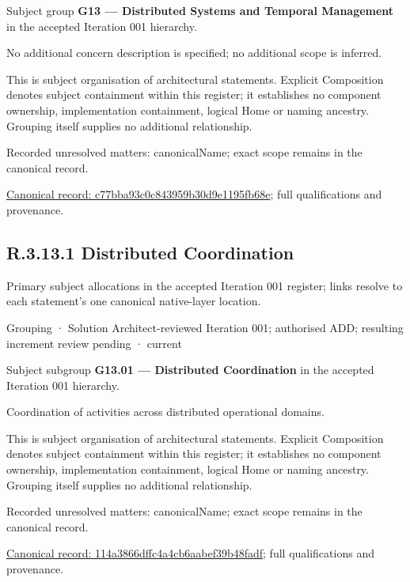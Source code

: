 Subject group \textbf{G13 — Distributed Systems and Temporal Management} in the accepted Iteration 001 hierarchy.



No additional concern description is specified; no additional scope is inferred.



This is subject organisation of architectural statements. Explicit Composition denotes subject containment within this register; it establishes no component ownership, implementation containment, logical Home or naming ancestry. Grouping itself supplies no additional relationship.


{\small Recorded unresolved matters: canonicalName; exact scope remains in the canonical record.}\par
{\footnotesize \href{../../../../continuum/grouping/c77bba93c0c843959b30d9e1195fb68e.md}{Canonical record: c77bba93c0c843959b30d9e1195fb68e}; full qualifications and provenance.}\par
\subsection*{R.3.13.1 Distributed Coordination}
\label{navigation:R.3.13.1}

Primary subject allocations in the accepted Iteration 001 register; links resolve to each statement’s one canonical native-layer location.\par
\label{element:114a3866dffc4a4cb6aabef39b48fadf}
{\small Grouping · Solution Architect-reviewed Iteration 001; authorised ADD; resulting increment review pending · current}\par

Subject subgroup \textbf{G13.01 — Distributed Coordination} in the accepted Iteration 001 hierarchy.



Coordination of activities across distributed operational domains.



This is subject organisation of architectural statements. Explicit Composition denotes subject containment within this register; it establishes no component ownership, implementation containment, logical Home or naming ancestry. Grouping itself supplies no additional relationship.


{\small Recorded unresolved matters: canonicalName; exact scope remains in the canonical record.}\par
{\footnotesize \href{../../../../continuum/grouping/114a3866dffc4a4cb6aabef39b48fadf.md}{Canonical record: 114a3866dffc4a4cb6aabef39b48fadf}; full qualifications and provenance.}\par
